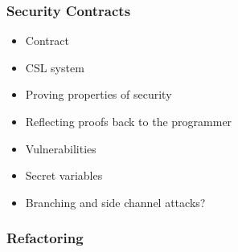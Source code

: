 \documentclass[a4paper,11pt]{article}
\begin{document}
\subsubsection{Security Contracts}


\begin{itemize}
    \item Contract
    \item CSL system
    \item Proving properties of security
    \item Reflecting proofs back to the programmer
    \item Vulnerabilities
    \item Secret variables
    \item Branching and side channel attacks?
\end{itemize}

\subsubsection{Refactoring}
\end{document}
